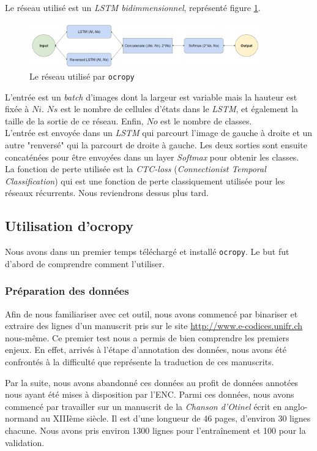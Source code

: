 \documentclass{report}
\begin{document}
Le réseau utilisé est un \textit{LSTM bidimmensionnel}, représenté figure \ref{nn}.

\begin{figure}[!h] 
	\center
	\includegraphics[width=10cm]{img/nn.png}
	\caption{Le réseau utilisé par \texttt{ocropy}}
	\label{nn}
\end{figure}

L'entrée est un \textit{batch} d'images dont la largeur est variable mais la hauteur est fixée à $Ni$. $Ns$ est le nombre de cellules d'états dans le \textit{LSTM}, et également la taille de la sortie de ce réseau. Enfin, $No$ est le nombre de classes. \\
L'entrée est envoyée dans un \textit{LSTM} qui parcourt l'image de gauche à droite et un autre "renversé" qui la parcourt de droite à gauche. Les deux sorties sont ensuite concaténées pour être envoyées dans un layer \textit{Softmax} pour obtenir les classes. \\
La fonction de perte utilisée est la \textit{CTC-loss} (\textit{Connectionist Temporal Classification}) qui est une fonction de perte classiquement utilisée pour les réseaux récurrents. Nous reviendrons dessus plus tard.

\subsection{Utilisation d'ocropy}

Nous avons dans un premier temps téléchargé et installé \texttt{ocropy}.
Le but fut d'abord de comprendre comment l'utiliser.

\subsubsection{Préparation des données}

Afin de nous familiariser avec cet outil, nous avons commencé par binariser et extraire des lignes d'un manuscrit pris sur le site \url{http://www.e-codices.unifr.ch} nous-même.
Ce premier test nous a permis de bien comprendre les premiers enjeux.
En effet, arrivés à l'étape d'annotation des données, nous avons été confrontés à la difficulté que représente la traduction de ces manuscrits.

Par la suite, nous avons abandonné ces données au profit de données annotées nous ayant été mises à disposition par l'ENC.
Parmi ces données, nous avons commencé par travailler sur un manuscrit de la \textit{Chanson d'Otinel} écrit en anglo-normand au XIIIème siècle.
Il est d'une longueur de 46 pages, d'environ 30 lignes chacune. Nous avons pris environ 1300 lignes pour l'entraînement et 100 pour la validation.
\end{document}

